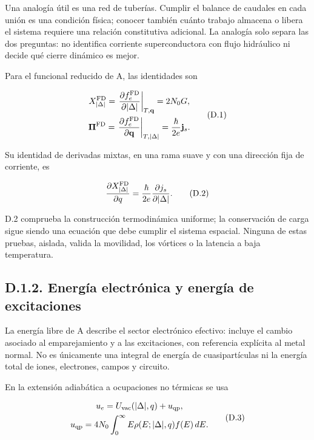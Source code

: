 \documentclass[
  spanish,
  10pt,
  a4paper,
]{article}
\begin{document}
Una analogía útil es una red de tuberías. Cumplir el balance de caudales
en cada unión es una condición física; conocer también cuánto trabajo
almacena o libera el sistema requiere una relación constitutiva
adicional. La analogía solo separa las dos preguntas: no identifica
corriente superconductora con flujo hidráulico ni decide qué cierre
dinámico es mejor.

Para el funcional reducido de A, las identidades son

\[
\begin{gathered}
X_{|\Delta|}^{\rm FD}
=\left.\frac{\partial f_e^{\rm FD}}{\partial |\Delta|}\right|_{T,\mathbf q}
=2N_0G,\\
\boldsymbol\Pi^{\rm FD}
=\left.\frac{\partial f_e^{\rm FD}}{\partial\mathbf q}\right|_{T,|\Delta|}
=\frac{\hbar}{2e}\mathbf j_s.
\end{gathered}\tag{D.1}
\]

Su identidad de derivadas mixtas, en una rama suave y con una dirección
fija de corriente, es

\[
\frac{\partial X_{|\Delta|}^{\rm FD}}{\partial q}
=\frac{\hbar}{2e}\frac{\partial j_s}{\partial|\Delta|}.
\tag{D.2}
\]

D.2 comprueba la construcción termodinámica uniforme; la conservación de
carga sigue siendo una ecuación que debe cumplir el sistema espacial.
Ninguna de estas pruebas, aislada, valida la movilidad, los vórtices o
la latencia a baja temperatura.

\subsection{D.1.2. Energía electrónica y energía de
excitaciones}\label{d.1.2.-energuxeda-electruxf3nica-y-energuxeda-de-excitaciones}

La energía libre de A describe el sector electrónico efectivo: incluye
el cambio asociado al emparejamiento y a las excitaciones, con
referencia explícita al metal normal. No es únicamente una integral de
energía de cuasipartículas ni la energía total de iones, electrones,
campos y circuito.

En la extensión adiabática a ocupaciones no térmicas se usa

\[
\begin{gathered}
u_e=U_{\rm vac}(|\Delta|,q)+u_{\rm qp},\\
u_{\rm qp}=4N_0\int_0^\infty E\rho(E;|\Delta|,q)f(E)\,dE.
\end{gathered}\tag{D.3}
\]
\end{document}
